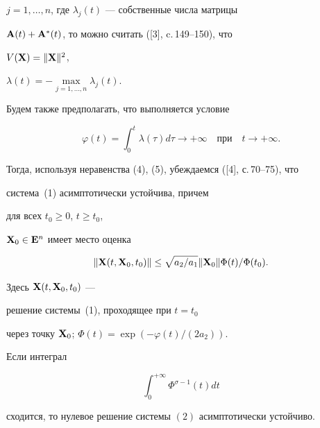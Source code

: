 $j=1,\dotsc,n$, где $\lambda_j(t)$ --- собственные числа матрицы


$\bold A(t)+\bold A^*(t)$, то можно считать ([3], c.\,149--150), что


$V(\bold X)=\|\bold X\|^2$,


$\lambda(t)=- \max\limits_{j=1,\dotsc,n} \lambda_j(t)$.





Будем также предполагать, что выполняется условие


\begin{equation}


\varphi(t)=\int_0^t \lambda(\tau) d\tau \to +\infty \quad


\text{при} \quad t\to +\infty.


\end{equation}


Тогда, используя неравенства (4), (5), убеждаемся ([4], с.\,70--75), что


система~(1) асимптотически устойчива, причем


для всех $t_0\geq 0$, $t\geq t_0$,


$\bold X_0 \in \bold E^n$ имеет место оценка


$$


\|\bold X(t,\bold X_0,t_0)\|\leq\sqrt{a_2/a_1}


\|\bold X_0\|  \Phi(t)/\Phi(t_0).


$$


Здесь $\bold X(t,\bold X_0,t_0)$ --- 


решение системы~(1), проходящее при $t=t_0$


через точку $\bold X_0$; $\Phi(t)=\exp(-\varphi(t)/(2a_2))$.





\begin{thm}


Если интеграл


$$


\int_0^{+\infty}\Phi^{\sigma-1}(t) dt


$$


сходится, то нулевое решение системы $(2)$ асимптотически устойчиво.


\end{thm}





